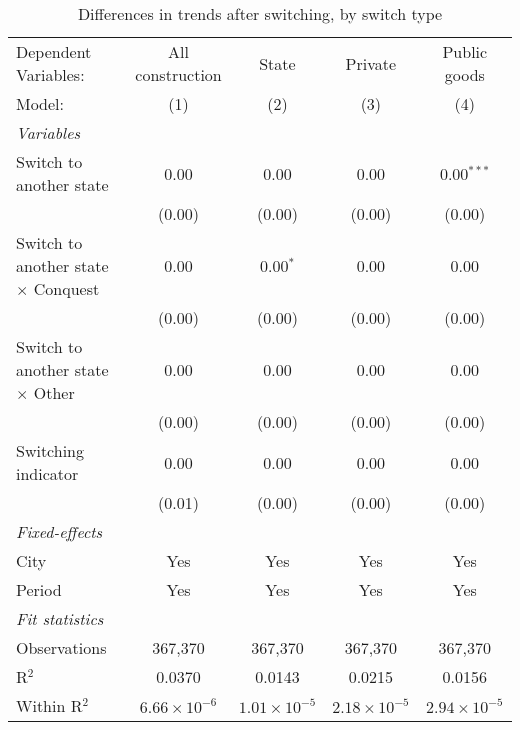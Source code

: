 \begin{table}[htbp]
   \caption{\label{tab:baseline_1y} Differences in trends after switching, by switch type}
   \centering
   \begin{tabular}{lcccc}
      \tabularnewline \midrule \midrule
      Dependent Variables:                       & All construction      & State                 & Private               & Public goods\\  
      Model:                                     & (1)                   & (2)                   & (3)                   & (4)\\  
      \midrule
      \emph{Variables}\\
      Switch to another state                    & 0.00                  & 0.00                  & 0.00                  & 0.00$^{***}$\\   
                                                 & (0.00)                & (0.00)                & (0.00)                & (0.00)\\   
      Switch to another state $\times$ Conquest  & 0.00                  & 0.00$^{*}$            & 0.00                  & 0.00\\   
                                                 & (0.00)                & (0.00)                & (0.00)                & (0.00)\\   
      Switch to another state $\times$ Other     & 0.00                  & 0.00                  & 0.00                  & 0.00\\   
                                                 & (0.00)                & (0.00)                & (0.00)                & (0.00)\\   
      Switching indicator                        & 0.00                  & 0.00                  & 0.00                  & 0.00\\   
                                                 & (0.01)                & (0.00)                & (0.00)                & (0.00)\\   
      \midrule
      \emph{Fixed-effects}\\
      City                                       & Yes                   & Yes                   & Yes                   & Yes\\  
      Period                                     & Yes                   & Yes                   & Yes                   & Yes\\  
      \midrule
      \emph{Fit statistics}\\
      Observations                               & 367,370               & 367,370               & 367,370               & 367,370\\  
      R$^2$                                      & 0.0370                & 0.0143                & 0.0215                & 0.0156\\  
      Within R$^2$                               & $6.66\times 10^{-6}$  & $1.01\times 10^{-5}$  & $2.18\times 10^{-5}$  & $2.94\times 10^{-5}$\\   
      \midrule \midrule
      

\end{tabular}
\end{table}
